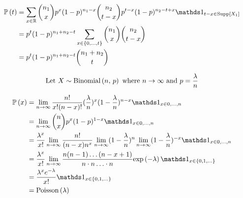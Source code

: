 \documentclass[12pt]{article}
\begin{document}
\begin{enumerate}

\begin{align*}
    \prob{t} &= \sum_{x \in \reals} {n_1 \choose x}p^x(1-p)^{n_1-x}{n_2 \choose t-x}p^{t-x}(1-p)^{n_2-t+x}\indic{t-x \in \support{X_1}} \\ 
    &= p^t(1-p)^{n_1+n_2-t}\sum_{x \in \braces{0, \ldots, t}}{n_1 \choose x}{n_2 \choose t-x} \\
    &= p^t(1-p)^{n_1+n_2-t}{n_1 + n_2 \choose t}
\end{align*}


\begin{align*}
    \text{Let } X \sim \mathrm{Binomial}\left(n,\,p\right) \text{ where } n \to\infty \text{ and } p = \frac{\lambda}{n}
\end{align*}

\begin{align*}
    \prob{x} &=  \lim_{n \to \infty} \frac{n!}{x!(n-x)!} (\frac{\lambda}{n})^x(1 - \frac{\lambda}{n})^{n-x} \indic{x \in {0, \ldots, n}} \\
    &= \lim_{n \to \infty} {n \choose x} p^x(1-p)^{1-x}\indic{x \in {0, \ldots, n}} \\
    &= \frac{\lambda^x}{x!} \lim_{n \to \infty} \frac{n!}{(n-x)n^x} \lim_{n \to \infty} (1 - \frac{\lambda}{n})^n \lim_{n \to \infty} (1-\frac{\lambda}{n})^{-x} \indic{x \in {0, \ldots, n}} \\ 
    &= \frac{\lambda^x}{x!} \lim_{n \to \infty} \frac{n(n-1)\ldots(n-x+1)}{n \cdot n \ldots \cdot n} \exp{- \lambda} \indic{x \in \braces{0, 1, \ldots}} \\ 
    &= \frac{\lambda^x e^{-\lambda}}{x!} \indic{x \in \braces{0, 1, \ldots}} \\ 
    &= \poisson{\lambda} 
\end{align*}




\end{enumerate}
\end{document}
